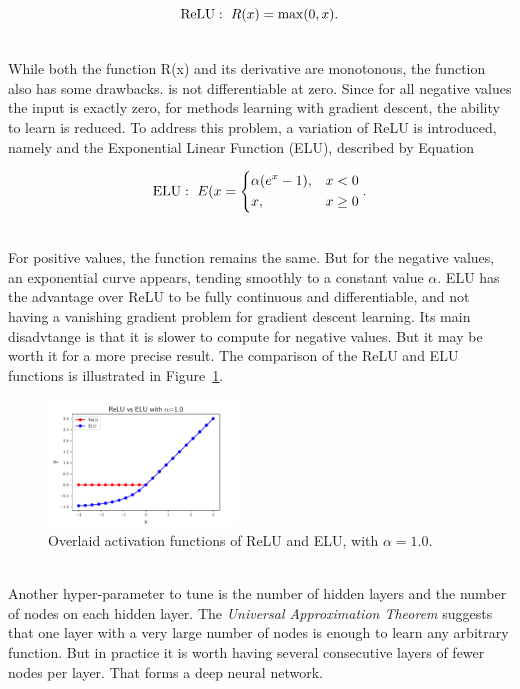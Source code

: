 \begin{equation}
   \ReLU:~R(x)= \max(0, x).
\end{equation}

\ \\While both the function R(x) and its derivative are monotonous, the function also has some drawbacks. is not differentiable at zero. Since for all negative values the input is exactly zero, for methods learning with gradient descent, the ability to learn is reduced. To address this problem, a variation of ReLU is introduced, namely and the Exponential Linear Function (ELU), described by Equation

\begin{equation}
     \ELU:~E(x= 
\begin{dcases}
    \alpha(e^x -1), & x < 0\\
    x,              & x \geq 0
\end{dcases}.
\end{equation}

\ \\For positive values, the function remains the same. But for the negative values, an exponential curve appears, tending smoothly to a constant value $\alpha$. ELU has the advantage over ReLU to be fully continuous and differentiable, and not having a vanishing gradient problem for gradient descent learning. Its main disadvtange is that it is slower to compute for negative values. But it may be worth it for a more precise result. The comparison of the ReLU and ELU functions is illustrated in Figure~\ref{fig:ActivationFunctionsHiddenLayers}.

\begin{figure}[htb]
\centering
\includegraphics[width=0.45\textwidth]{plots/ActivationFunctionsHiddenLayers.pdf}
\caption{Overlaid activation functions of ReLU and ELU, with $\alpha=1.0$.}
\label{fig:ActivationFunctionsHiddenLayers}
\end{figure}

\ \\Another hyper-parameter to tune is the number of hidden layers and the number of nodes on each hidden layer. The \emph{Universal Approximation Theorem} suggests that one layer with a very large number of nodes is enough to learn any arbitrary function. But in practice it is worth having several consecutive layers of fewer nodes per layer. That forms a deep neural network. 

